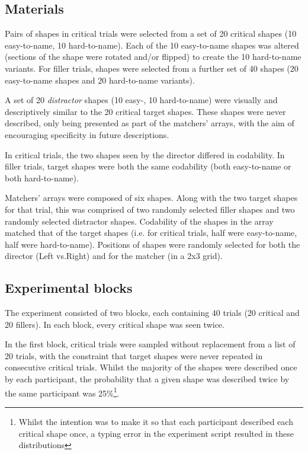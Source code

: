 \documentclass[a4paper,man,natbib]{apa6}
\newcommand*{\term}[1]{\emph{#1}} %
\begin{document}
\subsection{Materials}
Pairs of shapes in critical trials were selected from a set of 20 critical shapes (10 easy-to-name, 10 hard-to-name).
Each of the 10 easy-to-name shapes was altered (sections of the shape were rotated and/or flipped) to create the 10 hard-to-name variants. %
For filler trials, shapes were selected from a further set of 40 shapes (20 easy-to-name shapes and 20 hard-to-name variants). 

A set of 20 \term{distractor} shapes (10 easy-, 10 hard-to-name) were visually and descriptively similar to the 20 critical target shapes. %
These shapes were never described, only being presented as part of the matchers' arrays, with the aim of encouraging specificity in future descriptions.

In critical trials, the two shapes seen by the director differed in codability.
In filler trials, target shapes were both the same codability (both easy-to-name or both hard-to-name).

Matchers' arrays were composed of six shapes.
Along with the two target shapes for that trial, this was comprised of two randomly selected filler shapes and two randomly selected distractor shapes. 
Codability of the shapes in the array matched that of the target shapes (i.e. for critical trials, half were easy-to-name, half were hard-to-name).
Positions of shapes were randomly selected for both the director (Left vs.\@ Right) and for the matcher (in a 2x3 grid).


\subsection{Experimental blocks}

The experiment consisted of two blocks, each containing 40 trials (20 critical and 20 fillers). 
In each block, every critical shape was seen twice.

In the first block, critical trials were sampled without replacement from a list of 20 trials, with the constraint that target shapes were never repeated in consecutive critical trials.
Whilst the majority of the shapes were described once by each participant, the probability that a given shape was described twice by the same participant was 25\%\footnote{Whilst the intention was to make it so that each participant described each critical shape once, a typing error in the experiment script resulted in these distributions}. 
\end{document}
